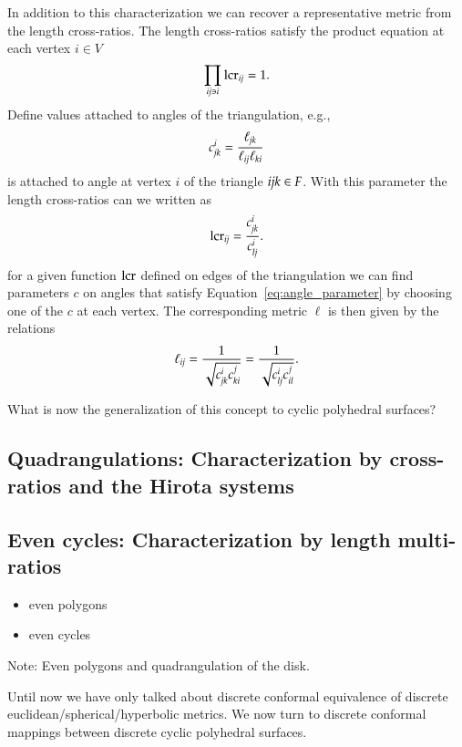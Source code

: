 \documentclass[Thesis]{subfiles}
\begin{document}
In addition to this characterization we can recover a representative metric from the length cross-ratios.
The length cross-ratios satisfy the product equation at each vertex $i\in V$
\begin{equation}
\prod_{\it ij\ni i} \operatorname{lcr}_{\it ij} = 1.
\end{equation}
Define values attached to angles of the triangulation, e.g., 
\begin{equation}
c^i_{\it jk}=\frac{\ell_{\it jk}}{\ell_{\it ij}\ell_{\it ki}}\label{eq:angle_parameter}
\end{equation} 
is attached to angle at vertex $i$ of the triangle $\it ijk\in F$.
With this parameter the length cross-ratios can we written as
\begin{equation}
\operatorname{lcr}_{\it ij}=\frac{c^i_{\it jk}}{c^i_{\it lj}}.
\end{equation}
for a given function $\operatorname{lcr}$ defined on edges of the triangulation we can find parameters $c$ on angles that satisfy Equation~\ref{eq:angle_parameter} by choosing one of the $c$ at each vertex.
The corresponding metric $\ell$ is then given by the relations
\begin{equation}
\ell_{\it ij} = \frac{1}{\sqrt{c^i_{\it jk}c^j_{\it ki}}} = \frac{1}{\sqrt{c^i_{\it lj}c^j_{\it il}}}.
\end{equation} 

What is now the generalization of this concept to cyclic polyhedral surfaces?

\subsection{Quadrangulations: Characterization by cross-ratios and the Hirota systems}
\label{sec:quads}

\subsection{Even cycles: Characterization by length multi-ratios}
\label{sec:even_cycles}

\begin{itemize}
\item even polygons
\item even cycles
\end{itemize}

Note: Even polygons and quadrangulation of the disk.

Until now we have only talked about discrete conformal equivalence of discrete euclidean/spherical/hyperbolic metrics.
We now turn to discrete conformal mappings between discrete cyclic polyhedral surfaces.
\end{document}

